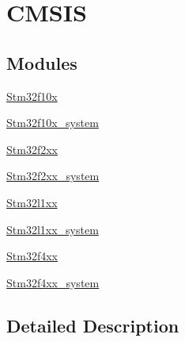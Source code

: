 \hypertarget{group___c_m_s_i_s}{\section{C\-M\-S\-I\-S}
\label{group___c_m_s_i_s}
}
\subsection*{Modules}
\begin{DoxyCompactItemize}
\item 
\hyperlink{group__stm32f10x}{Stm32f10x}
\item 
\hyperlink{group__stm32f10x__system}{Stm32f10x\-\_\-system}
\item 
\hyperlink{group__stm32f2xx}{Stm32f2xx}
\item 
\hyperlink{group__stm32f2xx__system}{Stm32f2xx\-\_\-system}
\item 
\hyperlink{group__stm32l1xx}{Stm32l1xx}
\item 
\hyperlink{group__stm32l1xx__system}{Stm32l1xx\-\_\-system}
\item 
\hyperlink{group__stm32f4xx}{Stm32f4xx}
\item 
\hyperlink{group__stm32f4xx__system}{Stm32f4xx\-\_\-system}
\end{DoxyCompactItemize}


\subsection{Detailed Description}
